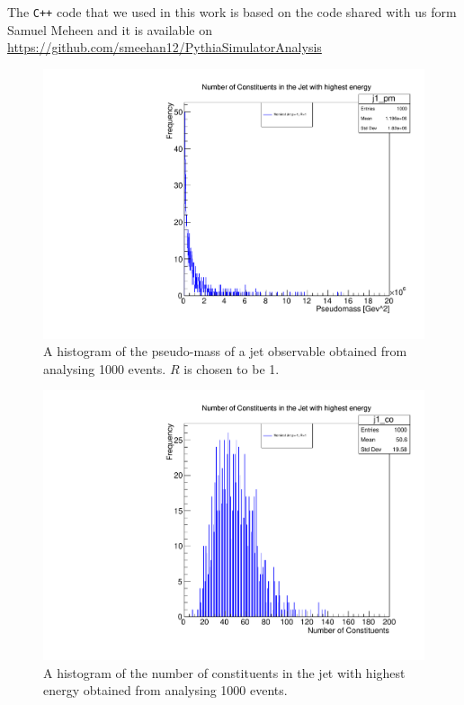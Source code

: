 The \verb!C++! code that we used in this work is based on the code shared with us form Samuel Meheen and it is available on \url{https://github.com/smeehan12/PythiaSimulatorAnalysis} 

\begin{figure}[hbtp]
\centering
\includegraphics[scale=.7]{images/myplot1.pdf}
\caption{A histogram of the pseudo-mass of a jet observable obtained from analysing 1000 events. $R$ is chosen to be 1.}
\end{figure}



\begin{figure}[hbtp]
\centering
\includegraphics[scale=.7]{images/myplot3.pdf}
\caption{A histogram of the number of constituents in the jet with highest energy obtained from analysing 1000 events.}
\end{figure}

